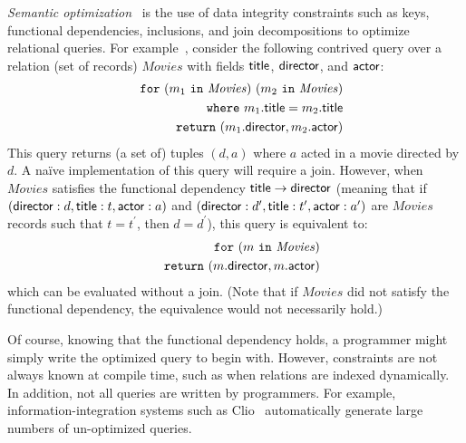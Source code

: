 \documentclass{sigplanconf}
\newcommand{\FOR}{{\tt for}\relax\ifmmode\ \else\xspace\fi}
\newcommand{\WHERE}{{\tt where}\relax\ifmmode\ \else\xspace\fi}
\newcommand{\IN}{ \ {\tt in} \ }
\newcommand{\RETURN}{{\tt return}\relax\ifmmode\ \else\xspace\fi}
\newcommand{\greg}[1]{\textcolor{blue}{GREG: #1}}
\newcommand{\relation}[1]{\ensuremath{\mathit{#1}}\xspace}
\begin{document}
{\it Semantic optimization}~\cite{foundations,Deutsch:2006:QRC:1121995.1122010,Popa99anequational} is the 
use of data integrity constraints such as keys, functional dependencies, inclusions, and join decompositions to optimize relational queries. For example~\cite{foundations}, consider the following contrived query over a relation (set of records) \relation{Movies} 
with fields ${\sf title}$, ${\sf director}$, and ${\sf actor}$:
\begin{eqnarray*}
& & \FOR (m_1 \IN \relation{Movies}) \ (m_2 \IN \relation{Movies}) \\
 & & \WHERE m_1.{\sf title} = m_2.{\sf title} \\
 & & \RETURN (m_1.{\sf director}, m_2.{\sf actor})
\end{eqnarray*}        
This query returns (a set of) tuples $(d,a)$ where $a$ acted in a movie directed by $d$.  A na\"ive implementation of this query will require a join.  However, when \relation{Movies} satisfies the functional dependency ${\sf title} \to {\sf director}$ (meaning that 
if $({\sf director}: d, {\sf title}: t, {\sf actor}: a)$ and $({\sf director}: d^\prime, {\sf title}: t^\prime, {\sf actor}: a^\prime)$ are \relation{Movies} records such that $t = t^\prime$, then $d = d^\prime$), this query is equivalent to:
\begin{eqnarray*}
& & \FOR (m \IN \relation{Movies}) \\
 & & \RETURN (m.{\sf director}, m.{\sf actor})
 \end{eqnarray*}
which can be evaluated without a join.  (Note that if \relation{Movies} did not satisfy the functional dependency, the equivalence would not necessarily hold.)  

Of course, knowing that the functional dependency holds, a programmer might simply write the optimized query to begin with.
However, constraints are not always known at compile time, such as when relations are indexed dynamically.
In addition, not all queries are written by programmers.
For example, information-integration systems such as Clio~\cite{haas:clio} automatically generate large numbers of un-optimized queries. %
\end{document}

